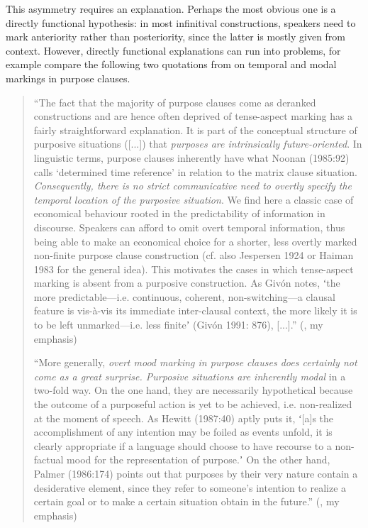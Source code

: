 \documentclass[output=paper,hidelinks]{langscibook}
\begin{document}
This asymmetry requires an explanation. Perhaps the most obvious one is a directly functional hypothesis: in most infinitival constructions, speakers need to mark anteriority rather than posteriority, since the latter is mostly given from context. However, directly functional explanations can run into problems, for example compare the following two quotations from \citet{Schmidtke-Bode2009} on temporal and modal markings in purpose clauses.

\begin{quote}
“The fact that the majority of purpose clauses come as deranked constructions and are hence often deprived of tense-aspect marking has a fairly straightforward explanation. It is part of the conceptual structure of purposive situations ([...]) that \emph{purposes are intrinsically future-oriented}. In linguistic terms, purpose clauses inherently have what Noonan (1985:92) calls ‘determined time reference’ in relation to the matrix clause situation. \emph{Consequently, there is no strict communicative need to overtly specify the temporal location of the purposive situation}. We find here a classic case of economical behaviour rooted in the predictability of information in discourse. Speakers can afford to omit overt temporal information, thus being able to make an economical choice for a shorter, less overtly marked non-finite purpose clause construction (cf. also Jespersen 1924 or Haiman 1983 for the general idea). This motivates the cases in which tense-aspect marking is absent from a purposive construction. As Givón notes, ʻthe more predictable—i.e. continuous, coherent, non-switching—a clausal feature is vis-à-vis its immediate inter-clausal context, the more likely it is to be left unmarked—i.e. less finiteʼ (Givón 1991: 876), [...].” (\citealt[42–43]{Schmidtke-Bode2009}, my emphasis)

“More generally, \emph{overt mood marking in purpose clauses does certainly not come as a great surprise. Purposive situations are inherently modal} in a two-fold way. On the one hand, they are necessarily hypothetical because the outcome of a purposeful action is yet to be achieved, i.e. non-realized at the moment of speech. As Hewitt (1987:40) aptly puts it, ʻ[a]s the accomplishment of any intention may be foiled as events unfold, it is clearly appropriate if a language should choose to have recourse to a non-factual mood for the representation of purpose.ʼ On the other hand, Palmer (1986:174) points out that purposes by their very nature contain a desiderative element, since they refer to someone’s intention to realize a certain goal or to make a certain situation obtain in the future.” (\citealt[45]{Schmidtke-Bode2009}, my emphasis)
\end{quote}
\end{document}
